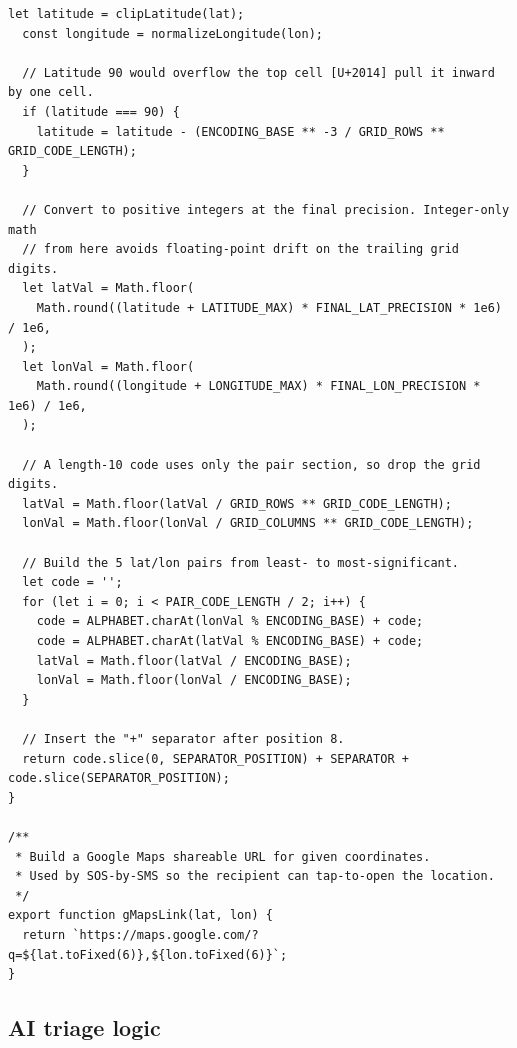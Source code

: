 \documentclass[11pt, a4paper]{article}
\begin{document}
\begin{lstlisting}[breaklines=true,postbreak=\mbox{\textcolor{gray}{$\hookrightarrow$\space}}]
  let latitude = clipLatitude(lat);
  const longitude = normalizeLongitude(lon);

  // Latitude 90 would overflow the top cell [U+2014] pull it inward by one cell.
  if (latitude === 90) {
    latitude = latitude - (ENCODING_BASE ** -3 / GRID_ROWS ** GRID_CODE_LENGTH);
  }

  // Convert to positive integers at the final precision. Integer-only math
  // from here avoids floating-point drift on the trailing grid digits.
  let latVal = Math.floor(
    Math.round((latitude + LATITUDE_MAX) * FINAL_LAT_PRECISION * 1e6) / 1e6,
  );
  let lonVal = Math.floor(
    Math.round((longitude + LONGITUDE_MAX) * FINAL_LON_PRECISION * 1e6) / 1e6,
  );

  // A length-10 code uses only the pair section, so drop the grid digits.
  latVal = Math.floor(latVal / GRID_ROWS ** GRID_CODE_LENGTH);
  lonVal = Math.floor(lonVal / GRID_COLUMNS ** GRID_CODE_LENGTH);

  // Build the 5 lat/lon pairs from least- to most-significant.
  let code = '';
  for (let i = 0; i < PAIR_CODE_LENGTH / 2; i++) {
    code = ALPHABET.charAt(lonVal % ENCODING_BASE) + code;
    code = ALPHABET.charAt(latVal % ENCODING_BASE) + code;
    latVal = Math.floor(latVal / ENCODING_BASE);
    lonVal = Math.floor(lonVal / ENCODING_BASE);
  }

  // Insert the "+" separator after position 8.
  return code.slice(0, SEPARATOR_POSITION) + SEPARATOR + code.slice(SEPARATOR_POSITION);
}

/**
 * Build a Google Maps shareable URL for given coordinates.
 * Used by SOS-by-SMS so the recipient can tap-to-open the location.
 */
export function gMapsLink(lat, lon) {
  return `https://maps.google.com/?q=${lat.toFixed(6)},${lon.toFixed(6)}`;
}
\end{lstlisting}

\subsection{AI triage logic}
\end{document}
